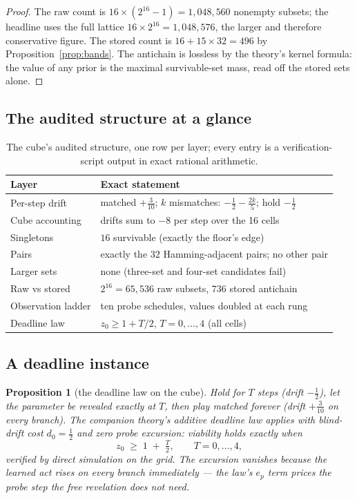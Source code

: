 \documentclass[10pt,twocolumn]{article}
\theoremstyle{plain}
\newtheorem{proposition}[theorem]{Proposition}
\theoremstyle{definition}
\theoremstyle{remark}
\begin{document}
\begin{proof}
The raw count is \(16 \times (2^{16} - 1) = 1{,}048{,}560\) nonempty
subsets; the headline uses the full lattice
\(16 \times 2^{16} = 1{,}048{,}576\), the larger and therefore
conservative figure. The stored count is
\(16 + 15 \times 32 = 496\) by Proposition~\ref{prop:bands}. The
antichain is lossless by the theory's kernel formula: the
value of any prior is the maximal survivable-set mass, read off the
stored sets alone.
\end{proof}

\subsection{The audited structure at a glance}\label{glance}

\begin{table}[t]
\centering\footnotesize
\caption{The cube's audited structure, one row per layer; every entry is a
verification-script output in exact rational arithmetic.}
\label{tab:glance}
\begin{tabular}{@{}l p{4.9cm}@{}}
\toprule
Layer & Exact statement \\
\midrule
Per-step drift & matched $+\tfrac3{10}$; $k$ mismatches: $-\tfrac12-\tfrac{2k}{5}$; hold $-\tfrac12$ \\
Cube accounting & drifts sum to $-8$ per step over the 16 cells \\
Singletons & $16$ survivable (exactly the floor's edge) \\
Pairs & exactly the $32$ Hamming-adjacent pairs; no other pair \\
Larger sets & none (three-set and four-set candidates fail) \\
Raw vs stored & $2^{16} = 65{,}536$ raw subsets, $736$ stored antichain \\
Observation ladder & ten probe schedules, values doubled at each rung \\
Deadline law & $z_0 \ge 1 + T/2$, $T = 0, \dots, 4$ (all cells) \\
\bottomrule
\end{tabular}
\end{table}

\subsection{A deadline instance}\label{deadline}

\begin{proposition}[the deadline law on the cube]\label{prop:deadline}
Hold for \(T\) steps (drift \(-\tfrac12\)), let the parameter be
revealed exactly at \(T\), then play matched forever (drift
\(+\tfrac3{10}\) on every branch). The companion theory's additive
deadline law applies with blind-drift cost \(d_{0} = \tfrac12\) and
zero probe excursion: viability holds exactly when
\[
z_{0} \;\ge\; 1 \;+\; \tfrac{T}{2}, \qquad T = 0, \dots, 4,
\]
verified by direct simulation on the grid. The excursion vanishes
because the learned act rises on every branch immediately --- the
law's \(e_{p}\) term prices the probe step the free revelation does
not need.
\end{proposition}
\end{document}
